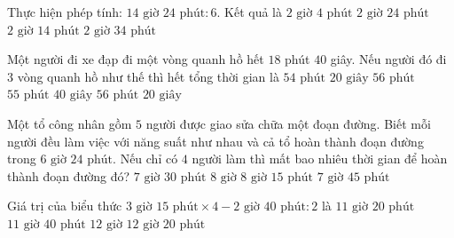\begin{ex} %
Thực hiện phép tính: $14\text{ giờ } 24\text{ phút} : 6$. Kết quả là
\choice
{$2\text{ giờ } 4\text{ phút}$}
{\True $2\text{ giờ } 24\text{ phút}$}
{$2\text{ giờ } 14\text{ phút}$}
{$2\text{ giờ } 34\text{ phút}$}
\end{ex}

\begin{ex} %
Một người đi xe đạp đi một vòng quanh hồ hết $18$ phút $40$ giây. Nếu người đó đi $3$ vòng quanh hồ như thế thì hết tổng thời gian là
\choice
{$54\text{ phút } 20\text{ giây}$}
{\True $56\text{ phút}$}
{$55\text{ phút } 40\text{ giây}$}
{$56\text{ phút } 20\text{ giây}$}
\end{ex}

\begin{ex} %
Một tổ công nhân gồm $5$ người được giao sửa chữa một đoạn đường. Biết mỗi người đều làm việc với năng suất như nhau và cả tổ hoàn thành đoạn đường trong $6\text{ giờ } 24\text{ phút}$. Nếu chỉ có $4$ người làm thì mất bao nhiêu thời gian để hoàn thành đoạn đường đó?
\choice
{$7\text{ giờ } 30\text{ phút}$}
{\True $8\text{ giờ}$}
{$8\text{ giờ } 15\text{ phút}$}
{$7\text{ giờ } 45\text{ phút}$}
\end{ex}

\begin{ex} %
Giá trị của biểu thức $3\text{ giờ } 15\text{ phút} \times 4 - 2\text{ giờ } 40\text{ phút} : 2$ là
\choice
{$11\text{ giờ } 20\text{ phút}$}
{\True $11\text{ giờ } 40\text{ phút}$}
{$12\text{ giờ}$}
{$12\text{ giờ } 20\text{ phút}$}
\end{ex}

